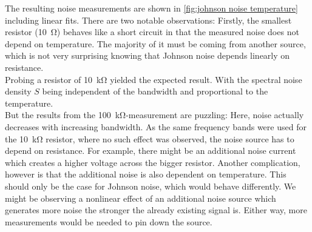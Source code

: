 \documentclass[
    parskip=half, 
    twoside=false,
    twocolumn=true,
    fontsize=11pt,
]{scrarticle}
\begin{document}

The resulting noise measurements are shown in \autoref{fig:johnson noise temperature} including linear fits.
There are two notable observations: 
Firstly, the smallest resistor (\SI{10}{\ohm}) behaves like a short circuit in that the measured noise does not depend on temperature. 
The majority of it must be coming from another source, which is not very surprising knowing that Johnson noise depends linearly on resistance.\\
Probing a resistor of \SI{10}{\kilo\ohm} yielded the expected result. 
With the spectral noise density $S$ being independent of the bandwidth and proportional to the temperature.\\
But the results from the \SI{100}{\kilo\ohm}-measurement are puzzling: Here, noise actually decreases with increasing bandwidth.
As the same frequency bands were used for the \SI{10}{\kilo\ohm} resistor, where no such effect was observed, the noise source has to depend on resistance. 
For example, there might be an additional noise current which creates a higher voltage across the bigger resistor.
Another complication, however is that the additional noise is also dependent on temperature. 
This should only be the case for Johnson noise, which would behave differently. 
We might be observing a nonlinear effect of an additional noise source which generates more noise the stronger the already existing signal is.
Either way, more measurements would be needed to pin down the source.
\end{document}

